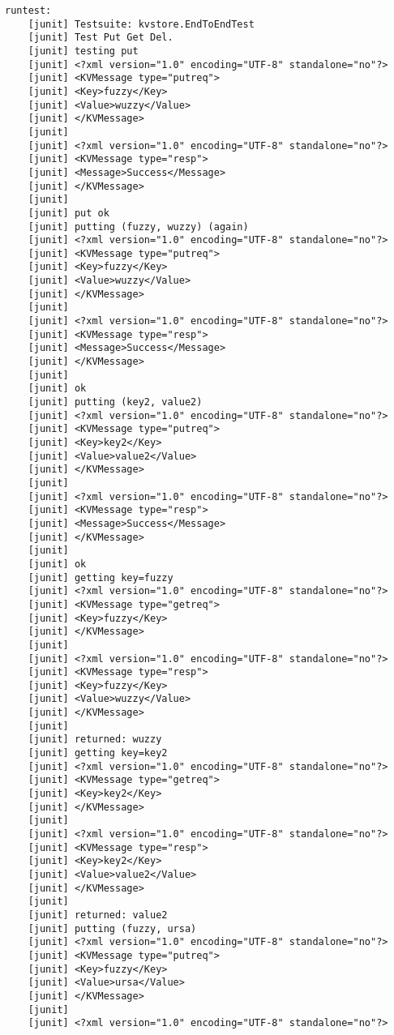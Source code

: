 \documentclass{article}
\begin{document}
\begin{lstlisting}
runtest:
    [junit] Testsuite: kvstore.EndToEndTest
    [junit] Test Put Get Del.
    [junit] testing put
    [junit] <?xml version="1.0" encoding="UTF-8" standalone="no"?>
    [junit] <KVMessage type="putreq">
    [junit] <Key>fuzzy</Key>
    [junit] <Value>wuzzy</Value>
    [junit] </KVMessage>
    [junit] 
    [junit] <?xml version="1.0" encoding="UTF-8" standalone="no"?>
    [junit] <KVMessage type="resp">
    [junit] <Message>Success</Message>
    [junit] </KVMessage>
    [junit] 
    [junit] put ok
    [junit] putting (fuzzy, wuzzy) (again)
    [junit] <?xml version="1.0" encoding="UTF-8" standalone="no"?>
    [junit] <KVMessage type="putreq">
    [junit] <Key>fuzzy</Key>
    [junit] <Value>wuzzy</Value>
    [junit] </KVMessage>
    [junit] 
    [junit] <?xml version="1.0" encoding="UTF-8" standalone="no"?>
    [junit] <KVMessage type="resp">
    [junit] <Message>Success</Message>
    [junit] </KVMessage>
    [junit] 
    [junit] ok
    [junit] putting (key2, value2)
    [junit] <?xml version="1.0" encoding="UTF-8" standalone="no"?>
    [junit] <KVMessage type="putreq">
    [junit] <Key>key2</Key>
    [junit] <Value>value2</Value>
    [junit] </KVMessage>
    [junit] 
    [junit] <?xml version="1.0" encoding="UTF-8" standalone="no"?>
    [junit] <KVMessage type="resp">
    [junit] <Message>Success</Message>
    [junit] </KVMessage>
    [junit] 
    [junit] ok
    [junit] getting key=fuzzy
    [junit] <?xml version="1.0" encoding="UTF-8" standalone="no"?>
    [junit] <KVMessage type="getreq">
    [junit] <Key>fuzzy</Key>
    [junit] </KVMessage>
    [junit] 
    [junit] <?xml version="1.0" encoding="UTF-8" standalone="no"?>
    [junit] <KVMessage type="resp">
    [junit] <Key>fuzzy</Key>
    [junit] <Value>wuzzy</Value>
    [junit] </KVMessage>
    [junit] 
    [junit] returned: wuzzy
    [junit] getting key=key2
    [junit] <?xml version="1.0" encoding="UTF-8" standalone="no"?>
    [junit] <KVMessage type="getreq">
    [junit] <Key>key2</Key>
    [junit] </KVMessage>
    [junit] 
    [junit] <?xml version="1.0" encoding="UTF-8" standalone="no"?>
    [junit] <KVMessage type="resp">
    [junit] <Key>key2</Key>
    [junit] <Value>value2</Value>
    [junit] </KVMessage>
    [junit] 
    [junit] returned: value2
    [junit] putting (fuzzy, ursa)
    [junit] <?xml version="1.0" encoding="UTF-8" standalone="no"?>
    [junit] <KVMessage type="putreq">
    [junit] <Key>fuzzy</Key>
    [junit] <Value>ursa</Value>
    [junit] </KVMessage>
    [junit] 
    [junit] <?xml version="1.0" encoding="UTF-8" standalone="no"?>

\end{lstlisting}
\end{document}
